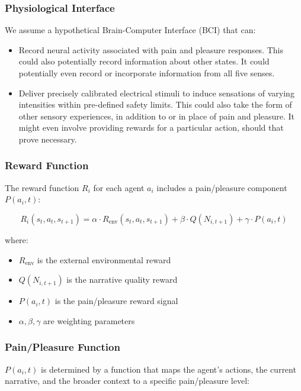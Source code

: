 \documentclass[12pt, a4paper]{article}
\begin{document}
\subsubsection{Physiological Interface}
We assume a hypothetical Brain-Computer Interface (BCI) that can:
\begin{itemize}
    \item Record neural activity associated with pain and pleasure responses. This could also potentially record information about other states. It could potentially even record or incorporate information from all five senses.
    \item Deliver precisely calibrated electrical stimuli to induce sensations of varying intensities within pre-defined safety limits. This could also take the form of other sensory experiences, in addition to or in place of pain and pleasure. It might even involve providing rewards for a particular action, should that prove necessary.
\end{itemize}

\subsubsection{Reward Function}
The reward function $R_i$ for each agent $a_i$ includes a pain/pleasure component $P(a_i, t)$:

\begin{equation}
R_i(s_t, a_t, s_{t+1}) = \alpha \cdot R_{\text{env}}(s_t, a_t, s_{t+1}) + \beta \cdot Q(N_{i,t+1}) + \gamma \cdot P(a_i, t)
\end{equation}

where:
\begin{itemize}
    \item $R_{\text{env}}$ is the external environmental reward
    \item $Q(N_{i,t+1})$ is the narrative quality reward
    \item $P(a_i, t)$ is the pain/pleasure reward signal
    \item $\alpha, \beta, \gamma$ are weighting parameters
\end{itemize}


\subsubsection{Pain/Pleasure Function}
$P(a_i, t)$ is determined by a function that maps the agent's actions, the current narrative, and the broader context to a specific pain/pleasure level:
\end{document}

